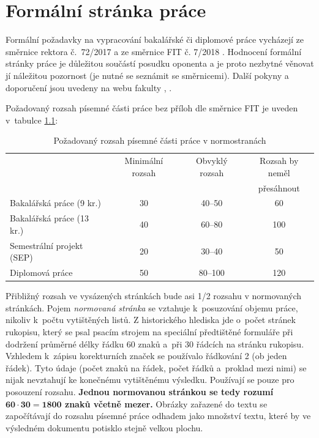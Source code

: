 \chapter{Formální stránka práce}
\label{formality}

Formální požadavky na vypracování bakalářské či diplomové práce vycházejí ze směrnice rektora č.~72/2017 \cite{smernice} a ze směrnice FIT č. 7/2018 \cite{smerniceFIT}. Hodnocení formální stránky práce je důležitou součástí posudku oponenta a je proto nezbytné věnovat jí náležitou pozornost (je nutné se seznámit se směrnicemi). Další pokyny a doporučení jsou uvedeny na webu fakulty \cite{formalniBP}, \cite{formalniDP}.

Požadovaný rozsah písemné části práce bez příloh dle směrnice FIT \cite{smerniceFIT} je uveden v~tabulce \ref{rozsah}:

\begin{table}[hbt]
\centering
\caption{Požadovaný rozsah písemné části práce v normostranách}
\label{rozsah}
\begin{tabular}{|l|c|c|c|}
\hline
 & Minimální rozsah & Obvyklý rozsah & Rozsah by neměl  \\
 &  &  & přesáhnout  \\ \hline
Bakalářská práce (9 kr.) & 30 & 40--50 & 60 \\ \hline
Bakalářská práce (13 kr.) & 40 & 60--80 & 100 \\ \hline
Semestrální projekt (SEP) & 20 & 30--40 & 50 \\ \hline
Diplomová práce & 50 & 80--100 & 120 \\ \hline
\end{tabular}
\end{table}
Přibližný rozsah ve vysázených stránkách bude asi 1/2 rozsahu v normovaných stránkách. Pojem {\it normovaná stránka} se vztahuje k~posuzování objemu práce, nikoliv k~počtu vytištěných listů. Z historického hlediska jde o~počet stránek rukopisu, který se psal psacím strojem na speciální předtištěné formuláře při dodržení průměrné délky řádku 60 znaků a~při 30 řádcích na stránku rukopisu. Vzhledem k~zápisu korekturních značek se používalo řádkování 2 (ob jeden řádek). Tyto údaje (počet znaků na řádek, počet řádků a~proklad mezi nimi) se nijak nevztahují ke konečnému vytištěnému výsledku. Používají se pouze pro posouzení rozsahu. \textbf{Jednou normovanou stránkou se tedy rozumí $\mathbf{60\cdot 30 = 1800}$ znaků včetně mezer.} Obrázky zařazené do textu se započítávají do rozsahu písemné práce odhadem jako množství textu, které by ve výsledném dokumentu potisklo stejně velkou plochu.

